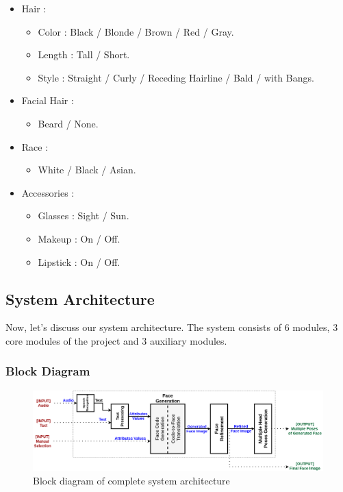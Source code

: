 \begin{itemize}
\begin{itemize}
    \end{itemize}
    \item Hair :
    \begin{itemize}
        \item Color : Black / Blonde / Brown / Red / Gray.
        \item Length : Tall / Short.
        \item Style : Straight / Curly / Receding Hairline / Bald / with Bangs.
    \end{itemize}
    \item Facial Hair :
    \begin{itemize}
        \item Beard / None.
    \end{itemize}
    \item Race :
    \begin{itemize}
        \item White / Black / Asian.
    \end{itemize}
    \item Accessories :
    \begin{itemize}
        \item Glasses : Sight / Sun.
        \item Makeup : On / Off.
        \item Lipstick : On / Off.
    \end{itemize}
\end{itemize}

\subsection{System Architecture}

Now, let's discuss our system architecture. The system consists of $6$ modules, $3$ core modules of the project and $3$ auxiliary modules.

\subsubsection{Block Diagram}

\begin{figure}[h]
    \centering
    \includegraphics[width=\textwidth]{images/system-design.png}
    \caption{Block diagram of complete system architecture}
    \label{fig:system}
\end{figure}

